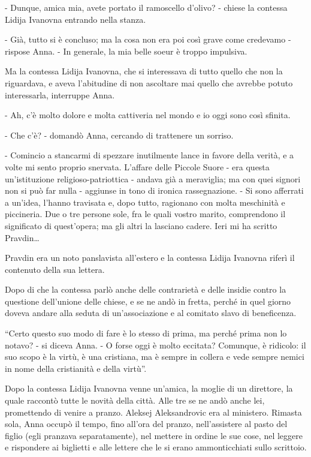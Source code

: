 - Dunque, amica mia, avete portato il ramoscello d'olivo? - chiese la contessa Lidija Ivanovna entrando nella stanza. 

- Già, tutto si è concluso; ma la cosa non era poi così grave come credevamo - rispose Anna. - In generale, la mia belle soeur è troppo impulsiva. 

Ma la contessa Lidija Ivanovna, che si interessava di tutto quello che non la riguardava, e aveva l'abitudine di non ascoltare mai quello che avrebbe potuto interessarla, interruppe Anna. 

- Ah, c'è molto dolore e molta cattiveria nel mondo e io oggi sono così sfinita. 

- Che c'è? - domandò Anna, cercando di trattenere un sorriso. 

- Comincio a stancarmi di spezzare inutilmente lance in favore della verità, e a volte mi sento proprio snervata. L'affare delle Piccole Suore - era questa un'istituzione religioso-patriottica - andava già a meraviglia; ma con quei signori non si può far nulla - aggiunse in tono di ironica rassegnazione. - Si sono afferrati a un'idea, l'hanno travisata e, dopo tutto, ragionano con molta meschinità e piccineria. Due o tre persone sole, fra le quali vostro marito, comprendono il significato di quest'opera; ma gli altri la lasciano cadere. Ieri mi ha scritto Pravdin\ldots{} 

Pravdin era un noto panslavista all'estero e la contessa Lidija Ivanovna riferì il contenuto della sua lettera. 

Dopo di che la contessa parlò anche delle contrarietà e delle insidie contro la questione dell'unione delle chiese, e se ne andò in fretta, perché in quel giorno doveva andare alla seduta di un'associazione e al comitato slavo di beneficenza. 

``Certo questo suo modo di fare è lo stesso di prima, ma perché prima non lo notavo? - si diceva Anna. - O forse oggi è molto eccitata? Comunque, è ridicolo: il suo scopo è la virtù, è una cristiana, ma è sempre in collera e vede sempre nemici in nome della cristianità e della virtù''. 

Dopo la contessa Lidija Ivanovna venne un'amica, la moglie di un direttore, la quale raccontò tutte le novità della città. Alle tre se ne andò anche lei, promettendo di venire a pranzo. Aleksej Aleksandrovic era al ministero. Rimasta sola, Anna occupò il tempo, fino all'ora del pranzo, nell'assistere al pasto del figlio (egli pranzava separatamente), nel mettere in ordine le sue cose, nel leggere e rispondere ai biglietti e alle lettere che le si erano ammonticchiati sullo scrittoio. 

